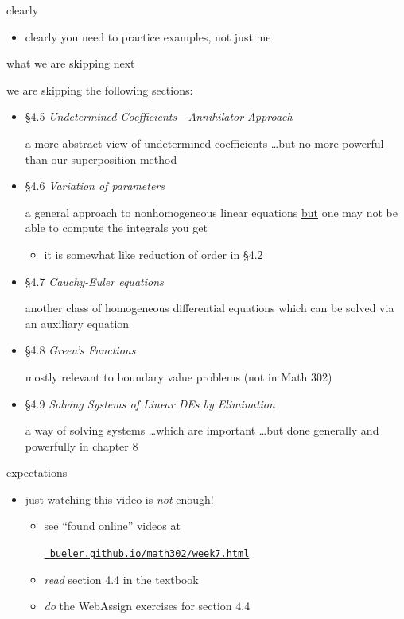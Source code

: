 \documentclass{beamer}
\begin{document}
\begin{frame}{clearly}

\begin{itemize}
\item clearly \alert{you} need to practice examples, not just me
\end{itemize}
\end{frame}


\begin{frame}{what we are skipping next}

we are \alert{skipping} the following sections:
\begin{itemize}
\item \S 4.5 \emph{Undetermined Coefficients---Annihilator Approach}

a more abstract view of undetermined coefficients \dots but no more powerful than our superposition method
\item \S 4.6 \emph{Variation of parameters}

a general approach to nonhomogeneous linear equations \underline{but} one may not be able to compute the integrals you get
    \begin{itemize}
    \item it is somewhat like reduction of order in \S 4.2
    \end{itemize}
\item \S 4.7 \emph{Cauchy-Euler equations}

another class of homogeneous differential equations which can be solved via an auxiliary equation
\item \S 4.8 \emph{Green's Functions}

mostly relevant to boundary value problems (not in Math 302)
\item \S 4.9 \emph{Solving Systems of Linear DEs by Elimination}

a way of solving systems \dots which are important \dots but done generally and powerfully in chapter 8
\end{itemize}
\end{frame}


\begin{frame}{expectations}

\begin{itemize}
\item just watching this video is \emph{not} enough!
     \begin{itemize}
     \item see ``found online'' videos at

     \centerline{\href{https://bueler.github.io/math302/week7.html}{\tt \color{cyan} bueler.github.io/math302/week7.html}}
     \item \emph{read} section 4.4 in the textbook
     \item \emph{do} the WebAssign exercises for section 4.4
     \end{itemize}
\end{itemize}
\end{frame}
\end{document}
